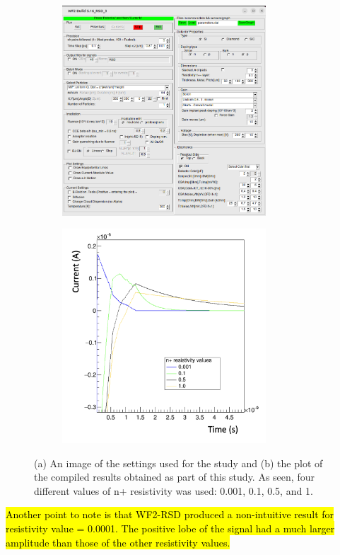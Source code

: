 \documentclass[11pt]{article}
\newcommand{\hlyellow}[1]{{\sethlcolor{yellow}\hl{#1}}}
\begin{document}
\begin{figure}[h!]
    \centering
    \begin{subfigure}[t]{0.49\textwidth}
        \centering
        \includegraphics[width=3in]{Images/n_resistivity_other_settings.png}
        \caption{}
        \label{fig:n_resistivity_other_settings}
    \end{subfigure}%
    \begin{subfigure}[t]{0.49\textwidth}
        \centering
        \includegraphics[width=3in]{Images/n_resistivity_plot.png}
        \caption{}
        \label{fig:n_resistivity_plot}
    \end{subfigure}
    \caption{(a) An image of the settings used for the study and (b) the plot of the compiled results obtained as part of this study. As seen, four different values of n+ resistivity was used: 0.001, 0.1, 0.5, and 1.}
    \label{fig:n_resistivity}
\end{figure}

\hlyellow{Another point to note is that WF2-RSD produced a non-intuitive result for resistivity value = 0.0001. The positive lobe of the signal had a much larger amplitude than those of the other resistivity values.}
\end{document}
